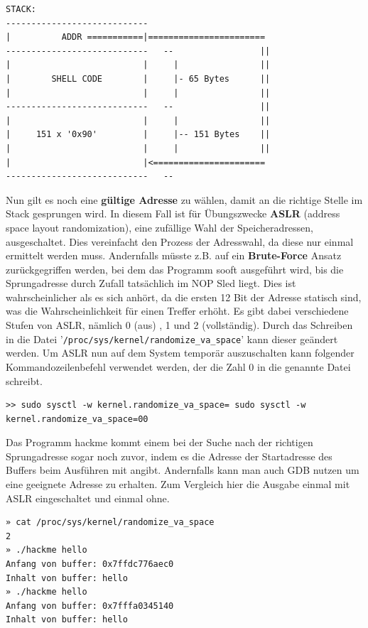 \documentclass[12pt]{article}
\begin{document}
\begin{lstlisting}
STACK:
----------------------------
|          ADDR ===========|=======================
----------------------------   --                 ||
|                          |     |                ||
|        SHELL CODE        |     |- 65 Bytes      ||
|                          |     |                ||
----------------------------   --                 ||
|                          |     |                ||
|     151 x '0x90'         |     |-- 151 Bytes    ||
|                          |     |                ||
|                          |<======================
----------------------------   --
\end{lstlisting}


Nun gilt es noch eine \textbf{gültige Adresse} zu wählen, damit an die richtige Stelle im Stack gesprungen wird. In diesem Fall ist für Übungszwecke \textbf{ASLR} (address space layout randomization), eine zufällige Wahl der Speicheradressen, ausgeschaltet. Dies vereinfacht den Prozess der Adresswahl, da diese nur einmal ermittelt werden muss. Andernfalls müsste z.B. auf ein \textbf{Brute-Force} Ansatz zurückgegriffen werden, bei dem das Programm sooft ausgeführt wird, bis die Sprungadresse durch Zufall tatsächlich im NOP Sled liegt. Dies ist wahrscheinlicher als es sich anhört, da die ersten 12 Bit der Adresse statisch sind, was die Wahrscheinlichkeit für einen Treffer erhöht.
\newline
\newline
Es gibt dabei verschiedene Stufen von ASLR, nämlich 0 (aus) , 1 und 2 (vollständig). Durch das Schreiben in die Datei '\texttt{/proc/sys/kernel/randomize\_va\_space}' kann dieser geändert werden.
Um ASLR nun auf dem System temporär auszuschalten kann folgender Kommandozeilenbefehl verwendet werden, der die Zahl 0 in die genannte Datei schreibt.

\begin{lstlisting}
>> sudo sysctl -w kernel.randomize_va_space= sudo sysctl -w kernel.randomize_va_space=00 
\end{lstlisting}
Das Programm hackme kommt einem bei der Suche nach der richtigen Sprungadresse sogar noch zuvor, indem es die Adresse der Startadresse des Buffers beim Ausführen mit angibt. Andernfalls kann man auch GDB nutzen um eine geeignete Adresse zu erhalten.
\newline
\newline
Zum Vergleich hier die Ausgabe einmal mit ASLR eingeschaltet und einmal ohne.
\begin{lstlisting}[caption={ASLR enabled}, captionpos=t]
» cat /proc/sys/kernel/randomize_va_space     
2
» ./hackme hello                              
Anfang von buffer: 0x7ffdc776aec0
Inhalt von buffer: hello
» ./hackme hello                              
Anfang von buffer: 0x7fffa0345140
Inhalt von buffer: hello
\end{lstlisting}
\end{document}
